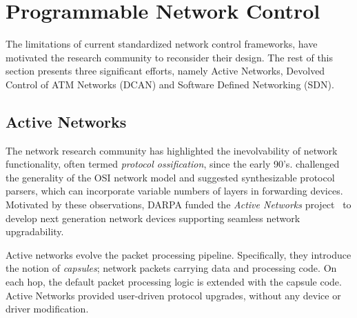 \section{Programmable Network Control} \label{sec:background:prog_control}

The limitations of current standardized network control frameworks, have
motivated the research community to reconsider their design.  The rest of this
section presents three significant efforts, namely Active Networks, Devolved
Control of ATM Networks (DCAN) and Software Defined Networking (SDN). 

\subsection{Active Networks}

The network research community has highlighted the inevolvability of network
functionality, often termed \textit{protocol ossification}, since the early
90's.   challenged the generality of the OSI network model
and suggested synthesizable protocol parsers, which can incorporate variable
numbers of layers in forwarding devices.  Motivated by these observations, DARPA
funded the \emph{Active Networks} project~ to develop
next generation network devices supporting seamless network upgradability. 

Active networks evolve the packet processing pipeline. Specifically, they
introduce the notion of \emph{capsules};  network packets carrying data and
processing code. On each hop, the default packet processing logic is extended
with the capsule code. Active Networks provided user-driven protocol upgrades,
without any device or driver modification.  

